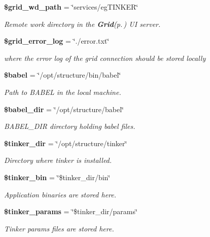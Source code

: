 \begin{CompactItemize}
{\bf \$grid\_\-wd\_\-path} = \char`\"{}services/eg\-TINKER\char`\"{}
\begin{CompactList}\small\item\em Remote work directory in the {\bf Grid}{\rm (p.\,\pageref{classGrid})} UI server. \item\end{CompactList}\item 
{\bf \$grid\_\-error\_\-log} = \char`\"{}./error.txt\char`\"{}
\begin{CompactList}\small\item\em where the error log of the grid connection should be stored locally \item\end{CompactList}\item 
{\bf \$babel} = \char`\"{}/opt/structure/bin/babel\char`\"{}
\begin{CompactList}\small\item\em Path to BABEL in the local machine. \item\end{CompactList}\item 
{\bf \$babel\_\-dir} = \char`\"{}/opt/structure/babel\char`\"{}
\begin{CompactList}\small\item\em BABEL\_\-DIR directory holding babel files. \item\end{CompactList}\item 
{\bf \$tinker\_\-dir} = \char`\"{}/opt/structure/tinker\char`\"{}
\begin{CompactList}\small\item\em Directory where tinker is installed. \item\end{CompactList}\item 
{\bf \$tinker\_\-bin} = \char`\"{}\$tinker\_\-dir/bin\char`\"{}
\begin{CompactList}\small\item\em Application binaries are stored here. \item\end{CompactList}\item 
{\bf \$tinker\_\-params} = \char`\"{}\$tinker\_\-dir/params\char`\"{}
\begin{CompactList}\small\item\em Tinker params files are stored here. \item\end{CompactList}\item 

\end{CompactItemize}
